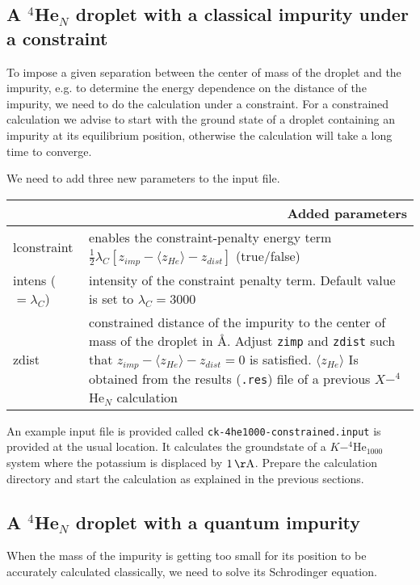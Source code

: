 \documentclass[10pt,a4paper]{article}
\begin{document}
	\subsection{A $^4$He$_{N}$ droplet with a classical impurity under a constraint}\label{sec:ck-constr}
	
	To impose a given separation between the center of mass of the droplet and the impurity, e.g. to determine the energy dependence on the distance of the impurity, we need to do the calculation under a constraint. For a constrained calculation we advise to start with the ground state of a droplet containing an impurity at its equilibrium position, otherwise the calculation will take a long time to converge.
	
	We need to add three new parameters to the input file.
		\begin{center}
		\begin{tabular}{l|p{9.25cm}}
			\multicolumn{2}{r}{\textbf{Added parameters}} \\
			\hline\hline
			lconstraint 			& enables the constraint-penalty energy term $\frac{1}{2}\lambda_C\left[ z_{imp}-\langle z_{He}\rangle -z_{dist}\right] $ (true/false) \\
			intens ($=\lambda_C$)			& intensity of the constraint penalty term. Default value is set to $\lambda_C=3000$ \\
			zdist 			& constrained distance of the impurity to the center of mass of the droplet in \AA. Adjust \verb|zimp| and \verb|zdist| such that $z_{imp}-\langle z_{He}\rangle -z_{dist}=0$ is satisfied. $\langle z_{He}\rangle$ Is obtained from the results (\verb|.res|) file of a previous $X-^4$He$_N$ calculation \\
		\end{tabular}
	\end{center}
	\vspace{0.2cm}
	An example input file is provided called \verb|ck-4he1000-constrained.input| is provided at the usual location. It calculates the groundstate of a $K-^4$He$_{1000}$ system where the potassium is displaced by $1\,\mathrm{\AA}$. Prepare the calculation directory and start the calculation as explained in the previous sections.
	
	\subsection{A $^4$He$_{N}$ droplet with a quantum impurity}
	When the mass of the impurity is getting too small for its position to be accurately calculated classically, we need to solve its Schrodinger equation. 
	
\end{document}
